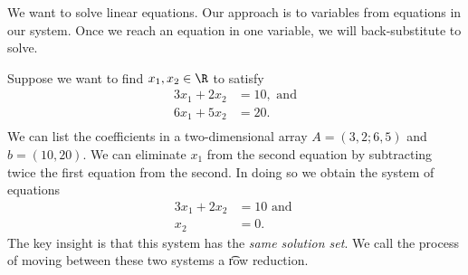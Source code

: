 

We want to solve linear equations.
Our approach is to  variables from equations in our system.
Once we reach an equation in one variable, we will back-substitute to solve.


Suppose we want to find $x_1, x_2 \in \R$ to satisfy
\[
\begin{aligned}
  3x_1 + 2x_2 &= 10, \text{ and} \\
  6x_1 + 5x_2 &= 20. \\
\end{aligned}
\]
We can list the coefficients in a two-dimensional array $A = (3, 2; 6, 5)$ and $b  = (10,20)$.
We can eliminate $x_1$ from the second equation by subtracting twice the first equation from the second.
In doing so we obtain the system of equations
\[
  \begin{aligned}
    3x_1 + 2x_2 &= 10 \text{ and } \\
    x_2 &= 0.
  \end{aligned}
\]
The key insight is that this system has the \textit{same solution set}.
We call the process of moving between these two systems a \t{row reduction}.


